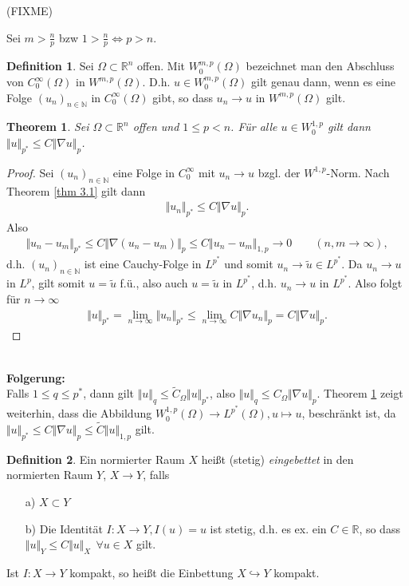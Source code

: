 \documentclass[
paper=a4,
bibtotocnumbered,
liststotocnumbered,
tablecaptionabove,
pointlessnumbers,
twoside,
openright,
10pt
]
{report}
\newtheorem{thm}{Theorem}[chapter]
\theoremstyle{definition}
\newtheorem*{df}{Definition}
\numberwithin{equation}{chapter}
\begin{document}
(FIXME)

Sei $m>\frac{n}{p}$ bzw $1 > \frac{n}{p}\iff p>n$.
\begin{df} Sei $\Omega \subset \mathbb{R}^n$ offen. Mit $W_0^{m,p}(\Omega)$ bezeichnet man den Abschluss von $C_0^{\infty}(\Omega)$ in $W^{m,p}(\Omega)$. D.h. $u \in W_0^{m,p}(\Omega)$ gilt genau dann, wenn es eine Folge $(u_n)_{n \in \mathbb{N}}$ in $C_0^{\infty}(\Omega)$ gibt, so dass $u_n \rightarrow u$ in $W^{m,p}(\Omega)$ gilt.
\end{df}
\begin{thm}\label{thm 3.2}
Sei $\Omega \subset \mathbb{R}^n$ offen und $ 1 \leq p < n$. Für alle $u \in W_0^{1,p}$ gilt dann $\Vert u \Vert_{p^*} \leq C \Vert \nabla u \Vert_p$.
\end{thm}
\begin{proof}
Sei $(u_n)_{n \in \mathbb{N}}$ eine Folge in $C_0^{\infty}$ mit $u_n \rightarrow u$ bzgl. der $W^{1,p}$-Norm. Nach Theorem \ref{thm 3.1} gilt dann
\begin{align*}
\Vert u_n \Vert_{p^*} \leq C \Vert \nabla u \Vert_p.
\end{align*}
Also 
\begin{align*}
\Vert u_n - u_m \Vert_{p^*} \leq C \Vert \nabla (u_n - u_m ) \Vert_p \leq C \Vert u_n - u_m \Vert_{1,p} \rightarrow 0 \qquad (n,m \rightarrow \infty),
\end{align*}
d.h. $(u_n)_{n \in \mathbb{N}}$ ist eine Cauchy-Folge in $L^{p^*}$ und somit $u_n \rightarrow \tilde{u} \in L^{p^*}$. Da $u_n \rightarrow u$ in $L^p$, gilt somit $u = \tilde{u}$ f.ü., also auch $u = \tilde{u}$ in $L^{p^*}$, d.h. $u_n \rightarrow u$ in $L^{p^*}$. Also folgt für $n \rightarrow \infty$
\begin{align*}
\Vert u \Vert_{p^*} = \lim\limits_{n \rightarrow \infty} \Vert u_n \Vert_{p^*} \leq \lim\limits_{n \rightarrow \infty} C \Vert \nabla u_n \Vert_{p} = C \Vert \nabla u \Vert_{p}.
\end{align*}
\end{proof}
\ 
\\
\textbf{Folgerung:} 
\\ Falls $1 \leq q \leq p^{*}$, dann gilt $\Vert u \Vert_q \leq \widetilde{C}_{\Omega} \Vert u \Vert_{p^*}$, also $\Vert u \Vert_q \leq C_{\Omega} \Vert \nabla u \Vert_p$. Theorem \ref{thm 3.2} zeigt weiterhin, dass die Abbildung $W_0^{1,p}(\Omega) \rightarrow L^{p^*}(\Omega), u \mapsto u$, beschränkt ist, da $\Vert u \Vert_{p^*} \leq C \Vert \nabla u \Vert_p \leq \widetilde{C} \Vert u \Vert_{1,p}$ gilt.
\begin{df}
Ein normierter Raum $X$ heißt (stetig) \textit{eingebettet} in den normierten Raum $Y$, $X \rightarrow Y$, falls
\begin{enumerate}
\item[a)] $X \subset Y$
\item[b)] Die Identität $I:X \rightarrow Y, I(u)=u$ ist stetig, d.h. es ex. ein $C \in \mathbb{R}$, so dass $\Vert u \Vert_Y \leq C \Vert u \Vert_X \ \ \forall u \in X$ gilt. 
\end{enumerate}
Ist $I:X \rightarrow Y$ kompakt, so heißt die Einbettung $X \hookrightarrow Y$ kompakt. 
\end{df}
\end{document}
